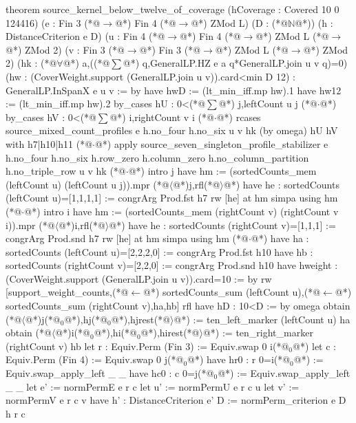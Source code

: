 theorem source_kernel_below_twelve_of_coverage
    (hCoverage : Covered 10 0 124416)
    (e : Fin 3 (*@$\to$@*) Fin 4 (*@$\to$@*) ZMod L) (D : (*@$\mathbb N$@*)) (h : DistanceCriterion e D)
    (u : Fin 4 (*@$\to$@*) Fin 4 (*@$\to$@*) ZMod L (*@$\to$@*) ZMod 2)
    (v : Fin 3 (*@$\to$@*) Fin 3 (*@$\to$@*) ZMod L (*@$\to$@*) ZMod 2)
    (hk : (*@$\forall$@*) a,((*@$\sum$@*) q,GeneralLP.HZ e a q*GeneralLP.join u v q)=0)
    (hw : (CoverWeight.support (GeneralLP.join u v)).card<min D 12) :
    GeneralLP.InSpanX e u v := by
  have hwD := (lt_min_iff.mp hw).1
  have hw12 := (lt_min_iff.mp hw).2
  by_cases hU : 0<(*@$\sum$@*) j,leftCount u j
  (*@$\cdot$@*) by_cases hV : 0<(*@$\sum$@*) i,rightCount v i
    (*@$\cdot$@*) rcases source_mixed_count_profiles e h.no_four h.no_six u v hk (by omega) hU hV with h7|h10|h11
      (*@$\cdot$@*) apply source_seven_singleton_profile_stabilizer e h.no_four h.no_six h.row_zero h.column_zero
          h.no_column_partition h.no_triple_row u v hk
        (*@$\cdot$@*) intro j
          have hm := (sortedCounts_mem (leftCount u) (leftCount u j)).mpr (*@$\langle$@*)j,rfl(*@$\rangle$@*)
          have he : sortedCounts (leftCount u)=[1,1,1,1] := congrArg Prod.fst h7
          rw [he] at hm
          simpa using hm
        (*@$\cdot$@*) intro i
          have hm := (sortedCounts_mem (rightCount v) (rightCount v i)).mpr (*@$\langle$@*)i,rfl(*@$\rangle$@*)
          have he : sortedCounts (rightCount v)=[1,1,1] := congrArg Prod.snd h7
          rw [he] at hm
          simpa using hm
      (*@$\cdot$@*) have ha : sortedCounts (leftCount u)=[2,2,2,0] := congrArg Prod.fst h10
        have hb : sortedCounts (rightCount v)=[2,2,0] := congrArg Prod.snd h10
        have hweight : (CoverWeight.support (GeneralLP.join u v)).card=10 := by
          rw [support_weight_counts,(*@$\leftarrow$@*) sortedCounts_sum (leftCount u),(*@$\leftarrow$@*) sortedCounts_sum (rightCount v),ha,hb]
          rfl
        have hD : 10<D := by omega
        obtain (*@$\langle$@*)j(*@${}_0$@*),hj(*@${}_0$@*),hjrest(*@$\rangle$@*) := ten_left_marker (leftCount u) ha
        obtain (*@$\langle$@*)i(*@${}_0$@*),hi(*@${}_0$@*),hirest(*@$\rangle$@*) := ten_right_marker (rightCount v) hb
        let r : Equiv.Perm (Fin 3) := Equiv.swap 0 i(*@${}_0$@*)
        let c : Equiv.Perm (Fin 4) := Equiv.swap 0 j(*@${}_0$@*)
        have hr0 : r 0=i(*@${}_0$@*) := Equiv.swap_apply_left _ _
        have hc0 : c 0=j(*@${}_0$@*) := Equiv.swap_apply_left _ _
        let e' := normPermE e r c
        let u' := normPermU e r c u
        let v' := normPermV e r c v
        have h' : DistanceCriterion e' D := normPerm_criterion e D h r c
